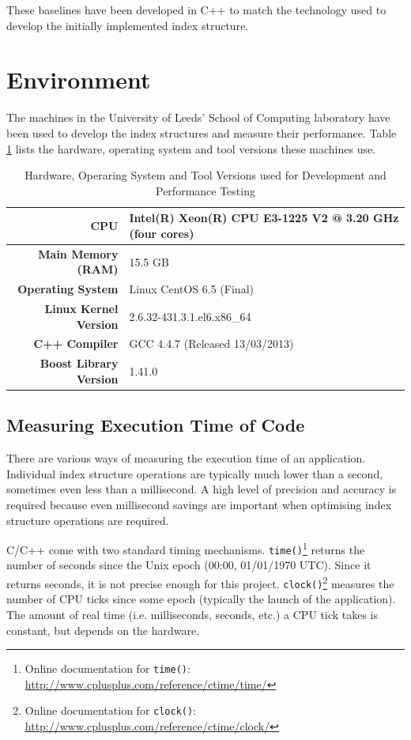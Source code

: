 These baselines have been developed in C++ to match the technology used to develop the initially implemented index structure.

\section{Environment}

The machines in the University of Leeds' School of Computing laboratory have been used to develop the index structures and measure their performance. Table \ref{tab:system-specifications} lists the hardware, operating system and tool versions these machines use.

\begin{table}
	\centering
	\begin{tabular}{|r|l|}
		\hline
		\textbf{CPU} & Intel(R) Xeon(R) CPU E3-1225 V2 @ 3.20 GHz (four cores) \\
		\hline
		\textbf{Main Memory (RAM)} & 15.5 GB \\
		\hline
		\textbf{Operating System} & Linux CentOS 6.5 (Final) \\
		\hline
		\textbf{Linux Kernel Version} & 2.6.32-431.3.1.el6.x86\_64 \\
		\hline
		\textbf{C++ Compiler} & GCC 4.4.7 (Released 13/03/2013) \\
		\hline
		\textbf{Boost Library Version} & 1.41.0 \\
		\hline
	\end{tabular}
	\caption{Hardware, Operaring System and Tool Versions used for Development and Performance Testing}
	\label{tab:system-specifications}
\end{table}

\subsection{Measuring Execution Time of Code}

There are various ways of measuring the execution time of an application. Individual index structure operations are typically much lower than a second, sometimes even less than a millisecond. A high level of precision and accuracy is required because even millisecond savings are important when optimising index structure operations are required.

C/C++ come with two standard timing mechanisms. \texttt{time()}\footnote{Online documentation for \texttt{time()}: \url{http://www.cplusplus.com/reference/ctime/time/}} returns the number of seconds since the Unix epoch (00:00, 01/01/1970 UTC). Since it returns seconds, it is not precise enough for this project. \texttt{clock()}\footnote{Online documentation for \texttt{clock()}: \url{http://www.cplusplus.com/reference/ctime/clock/}}  measures the number of CPU ticks since some epoch (typically the launch of the application). The amount of real time (i.e. milliseconds, seconds, etc.) a CPU tick takes is constant, but depends on the hardware.

